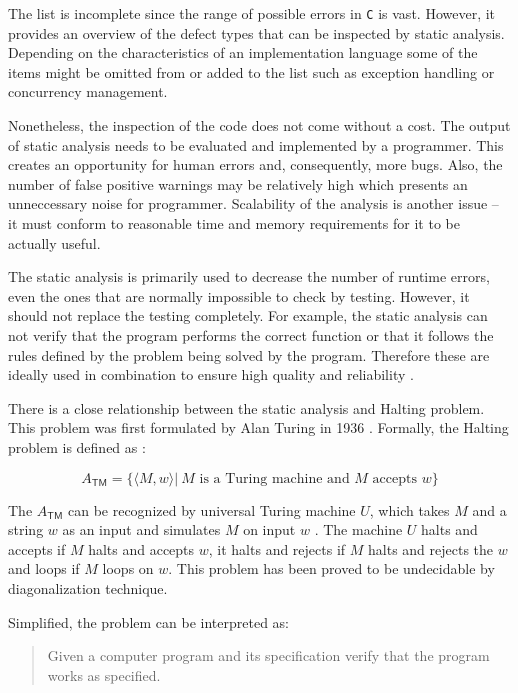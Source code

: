\documentclass[12pt,final,oneside]{fithesis2}
\theoremstyle{definition}
\begin{document}
The list is incomplete since the range of possible errors in \texttt{C} is
vast. However, it provides an overview of the defect types that can be
inspected by static analysis. Depending on the characteristics of an
implementation language some of the items might be omitted from or added
to the list such as exception handling or concurrency management.

Nonetheless, the inspection of the code does not come without a cost.
The output of static analysis needs to be evaluated and implemented by a
programmer. This creates an opportunity for human errors and, consequently,
more bugs. Also, the number of false positive warnings may be relatively
high which presents an unneccessary noise for programmer. Scalability
of the analysis is another issue -- it must conform to reasonable time
and memory requirements for it to be actually useful.

The static analysis is primarily used to decrease the number of runtime
errors, even the ones that are normally impossible to check by testing.
However, it should not replace the testing completely. For example,
the static analysis can not verify that the program performs the correct
function or that it follows the rules defined by the problem
being solved by the program. Therefore these are ideally used in
combination to ensure high quality and reliability \cite{Ernst03-1}.

There is a close relationship between the static analysis and Halting
problem. This problem was first formulated by Alan Turing in 1936
\cite{Turing36-1}. Formally, the Halting problem is defined as
\cite{Sipser06-1}:

\begin{equation*}
A_{\mathsf{TM}} = \{ \langle M, w \rangle |
  \: M \text{ is a Turing machine and } M \text{ accepts } w \}
\end{equation*}

The $A_{\mathsf{TM}}$ can be recognized by universal Turing machine
$U$, which takes $M$ and a string $w$ as an input and simulates $M$ on input
$w$ \cite{Kozen97-1}. The machine $U$ halts and accepts if $M$ halts and
accepts $w$, it halts and rejects if $M$ halts and rejects the $w$ and loops
if $M$ loops on $w$. This problem has been proved to be undecidable by
diagonalization technique.

Simplified, the problem can be interpreted as:

\begin{quote}

Given a computer program and its specification verify that the program
works as specified.

\end{quote}
\end{document}
